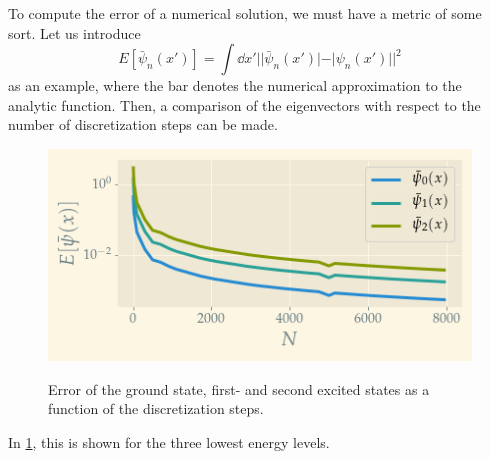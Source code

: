 To compute the error of a numerical solution, we must have a metric of some sort. Let us introduce
\begin{equation} 
E[\bar\psi_n(x')] = \int\dd{x'}||\bar \psi_n(x')|-|\psi_n(x')||^2
\end{equation}
as an example, where the bar denotes the numerical approximation to the analytic function.
Then, a comparison of the eigenvectors with respect to the number of discretization steps can be made. 
\begin{figure}
	\includegraphics[width=\linewidth]{img/discretization_step.png}
	\label{fig:discretization}
	\caption{Error of the ground state, first- and second excited states as a function of the discretization steps.}
\end{figure}
In \cref{fig:discretization}, this is shown for the three lowest energy levels. 


